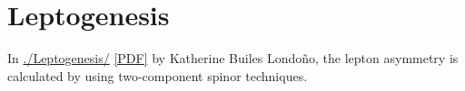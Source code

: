 \chapter{Leptogenesis}



In \url{./Leptogenesis/} \href{https://github.com/restrepo/beyond-the-standard-model/raw/master/Leptogenesis/main.pdf}{[PDF]} by Katherine Builes Londoño, the lepton asymmetry is calculated by using two-component spinor techniques.


